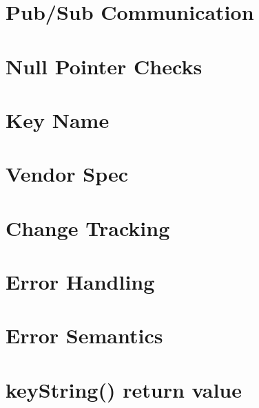 \let\mypdfximage\pdfximage\def\pdfximage{\immediate\mypdfximage}\documentclass[twoside]{book}
\newcommand{\+}{\discretionary{\mbox{\scriptsize$\hookleftarrow$}}{}{}}
\begin{document}
\chapter{Pub/\+Sub Communication}
\label{doc_decisions_0b_rejected_elektra_web_pubsub_md}

\chapter{Null Pointer Checks}
\label{doc_decisions_0b_rejected_null_pointer_checks_md}

\chapter{Key Name}
\label{doc_decisions_0b_rejected_separate_key_name_md}

\chapter{Vendor Spec}
\label{doc_decisions_0b_rejected_vendor_spec_md}

\chapter{Change Tracking}
\label{doc_decisions_1_problem_clear_change_tracking_md}

\chapter{Error Handling}
\label{doc_decisions_1_problem_clear_error_handling_md}

\chapter{Error Semantics}
\label{doc_decisions_1_problem_clear_error_semantics_md}

\chapter{key\+String() return value}
\label{doc_decisions_1_problem_clear_key_string_return_value_md}

\end{document}
